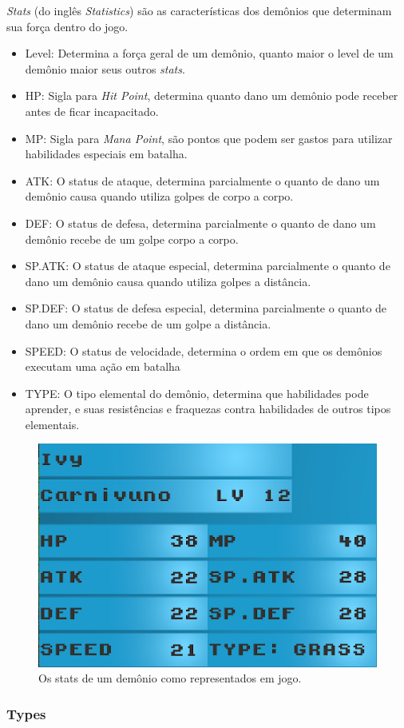 \documentclass[
	12pt,				%
	openright,			%
	twoside,			%
	a4paper,			%
	english,			%
	french,				%
	spanish,			%
	brazil				%
	]{abntex2}
\begin{document}
\emph{Stats} (do inglês \emph{Statistics}) são as características dos demônios que determinam sua força dentro do jogo.

\begin{itemize}
\item Level: Determina a força geral de um demônio, quanto maior o level de um demônio maior seus outros \emph{stats}.
\item HP: Sigla para \emph{Hit Point}, determina quanto dano um demônio pode receber antes de ficar incapacitado.
\item MP: Sigla para \emph{Mana Point}, são pontos que podem ser gastos para utilizar habilidades especiais em batalha.
\item ATK: O status de ataque, determina parcialmente o quanto de dano um demônio causa quando utiliza golpes de corpo a corpo.
\item DEF: O status de defesa, determina parcialmente o quanto de dano um demônio recebe de um golpe corpo a corpo.
\item SP.ATK: O status de ataque especial, determina parcialmente o quanto de dano um demônio causa quando utiliza golpes a distância.
\item SP.DEF: O status de defesa especial, determina parcialmente o quanto de dano um demônio recebe de um golpe a distância.
\item SPEED:  O status de velocidade, determina o ordem em que os demônios executam uma ação em batalha
\item TYPE: O tipo elemental do demônio, determina que habilidades pode aprender, e suas resistências e fraquezas contra habilidades de outros tipos elementais.
\end{itemize}

\begin{figure}[h!]
 \centering
  \includegraphics[width=0.5\linewidth]{statscreen.jpg}
  \caption{Os stats de um demônio como representados em jogo.}
  \label{fig:stats}
\end{figure}

\subsubsection{Types}
\end{document}
